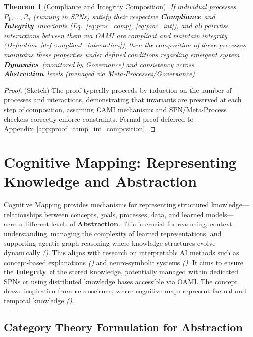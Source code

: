 \documentclass[12pt,a4paper]{report}
\renewcommand{\citep}[1]{\textit{\scriptsize{(\cite{#1})}}}
\newtheorem{theorem}{Theorem}[section]
\newcommand{\Compliance}{\textbf{Compliance}}
\newcommand{\Integrity}{\textbf{Integrity}}
\newcommand{\Abstraction}{\textbf{Abstraction}}
\newcommand{\Dynamics}{\textbf{Dynamics}}
\begin{document}
	\begin{theorem}[Compliance and Integrity Composition]
		\label{thm:comp_int_composition}
		If individual processes $P_1, \dots, P_n$ (running in SPNs) satisfy their respective \Compliance\ and \Integrity\ invariants (Eq.~\ref{eq:proc_comp}, \ref{eq:proc_int}), and all pairwise interactions between them via OAMI are compliant and maintain integrity (Definition~\ref{def:compliant_interaction}), then the composition of these processes maintains these properties under defined conditions regarding emergent system \Dynamics\ (monitored by Governance) and consistency across \Abstraction\ levels (managed via Meta-Processes/Governance).
	\end{theorem}
	\begin{proof}
		(Sketch) The proof typically proceeds by induction on the number of processes and interactions, demonstrating that invariants are preserved at each step of composition, assuming OAMI mechanisms and SPN/Meta-Process checkers correctly enforce constraints. Formal proof deferred to Appendix~\ref{app:proof_comp_int_composition}.
	\end{proof}
	
	\section{Cognitive Mapping: Representing Knowledge and Abstraction}
	\label{sec:2-3}
	
	Cognitive Mapping provides mechanisms for representing structured knowledge—relationships between concepts, goals, processes, data, and learned models—across different levels of \Abstraction. This is crucial for reasoning, context understanding, managing the complexity of learned representations, and supporting agentic graph reasoning where knowledge structures evolve dynamically \citep{Buehler2025AgenticGraphRef}. This aligns with research on interpretable AI methods such as concept-based explanations \citep{AdditionalCitationRef51} and neuro-symbolic systems \citep{AdditionalCitationRef52}. It aims to ensure the \Integrity\ of the stored knowledge, potentially managed within dedicated SPNs or using distributed knowledge bases accessible via OAMI. The concept draws inspiration from neuroscience, where cognitive maps represent factual and temporal knowledge \citep{Reconciling_Neuronal_Representations_2022}.
	
	\subsection{Category Theory Formulation for Abstraction}
	\label{sec:2-3-1}
	
\end{document}
